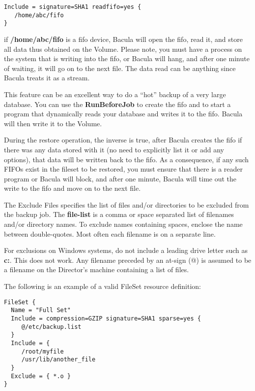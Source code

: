 \begin{description}
\begin{itemize}
\footnotesize
\begin{verbatim}
Include = signature=SHA1 readfifo=yes {
   /home/abc/fifo
}
\end{verbatim}
\normalsize

if {\bf /home/abc/fifo} is a fifo device, Bacula will open the  fifo, read it,
and store all data thus obtained on the Volume.  Please note, you must have a
process on the system that is  writing into the fifo, or Bacula will hang, and
after one  minute of waiting, it will go on to the next file. The data  read
can be anything since Bacula treats it as a stream.  

This feature can be an excellent way to do a ``hot''  backup of a very large
database. You can use the {\bf RunBeforeJob}  to create the fifo and to start
a program that dynamically reads  your database and writes it to the fifo.
Bacula will then write  it to the Volume.  

During the restore operation, the inverse is  true, after Bacula creates the
fifo if there was any data stored  with it (no need to explicitly list it or
add any options), that  data will be written back to the fifo. As a
consequence, if  any such FIFOs exist in the fileset to be restored, you must 
ensure that there is a reader program or Bacula will block,  and after one
minute, Bacula will time out the write to the  fifo and move on to the next
file. 
\end{itemize}

The Exclude Files specifies the list of files and/or directories to be
excluded from the backup job. The {\bf \lt{}file-list\gt{}} is a comma or
space separated list of filenames and/or directory names. To exclude names
containing spaces, enclose the name between double-quotes. Most often each
filename is on a separate line. 

For exclusions on Windows systems, do not include a leading drive letter such
as {\bf c:}. This does not work. Any filename preceded by an at-sign (@) is
assumed to be a filename on the Director's machine containing a list of files.

\end{description}

The following is an example of a valid FileSet resource definition: 

\footnotesize
\begin{verbatim}
FileSet {
  Name = "Full Set"
  Include = compression=GZIP signature=SHA1 sparse=yes {
     @/etc/backup.list
  }
  Include = {
     /root/myfile
     /usr/lib/another_file
  }
  Exclude = { *.o }
}
\end{verbatim}
\normalsize

